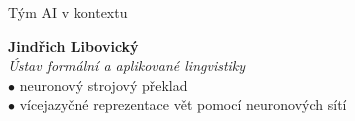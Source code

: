 \documentclass[handout,aspectratio=169,dvipsnames]{beamer}
\begin{document}
\begin{frame}{Tým AI v kontextu}
    \hspace{80pt}\begin{minipage}{70pt}
    \end{minipage}\begin{minipage}{250pt}
        \textbf{Jindřich Libovický} \\
        \textit{Ústav formální a aplikované lingvistiky} \\
        \quad$\bullet$ neuronový strojový překlad \\
        \quad$\bullet$ vícejazyčné reprezentace vět pomocí neuronových sítí
    \end{minipage}

\end{frame}




\end{document}
